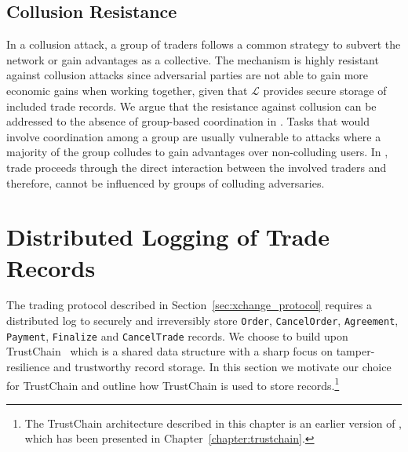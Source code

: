 \subsection{Collusion Resistance}
In a collusion attack, a group of traders follows a common strategy to subvert the network or gain advantages as a collective.
The \ModelName{} mechanism is highly resistant against collusion attacks since adversarial parties are not able to gain more economic gains when working together, given that $ \mathcal{L} $ provides secure storage of included trade records.
We argue that the resistance against collusion can be addressed to the absence of group-based coordination in \ModelName{}.
Tasks that would involve coordination among a group are usually vulnerable to attacks where a majority of the group colludes to gain advantages over non-colluding users.
In \ModelName{}, trade proceeds through the direct interaction between the involved traders and therefore, cannot be influenced by groups of colluding adversaries.

\section{Distributed Logging of Trade Records}
\label{sec:blockchain_accounting}
The \ModelName{} trading protocol described in Section~\ref{sec:xchange_protocol} requires a distributed log to securely and irreversibly store \texttt{Order}, \texttt{CancelOrder}, \texttt{Agreement}, \texttt{Payment}, \texttt{Finalize} and \texttt{CancelTrade} records.
We choose to build \ModelName{} upon TrustChain~\cite{otte2017trustchain} which is a shared data structure with a sharp focus on tamper-resilience and trustworthy record storage.
In this section we motivate our choice for TrustChain and outline how TrustChain is used to store \ModelName{} records.\footnote{The TrustChain architecture described in this chapter is an earlier version of \TrustChain{}, which has been presented in Chapter~\ref{chapter:trustchain}.}

